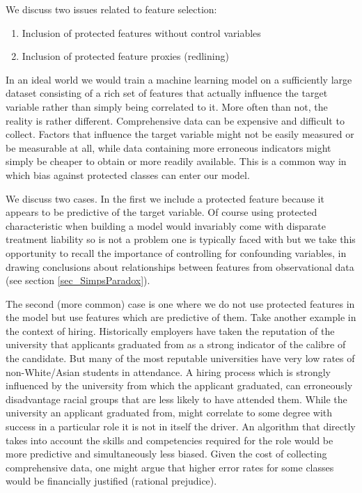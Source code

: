 We discuss two issues related to feature selection:
%
\begin{enumerate}
\item Inclusion of protected features without control variables
\item Inclusion of protected feature proxies (redlining)
\end{enumerate}

In an ideal world we would train a machine learning model on a sufficiently large dataset consisting of a rich set of features that actually influence the target variable rather than simply being correlated to it. More often than not, the reality is rather different. Comprehensive data can be expensive and difficult to collect. Factors that influence the target variable might not be easily measured or be measurable at all, while data containing more erroneous indicators might simply be cheaper to obtain or more readily available. This is a common way in which bias against protected classes can enter our model. 

We discuss two cases. In the first we include a protected feature because it appears to be predictive of the target variable. Of course using protected characteristic when building a model would invariably come with disparate treatment liability so is not a problem one is typically faced with but we take this opportunity to recall the importance of controlling for confounding variables, in drawing conclusions about relationships between features from observational data (see section \ref{sec_SimpsParadox}).

The second (more common) case is one where we do not use protected features in the model but use features which are predictive of them. Take another example in the context of hiring. Historically employers have taken the reputation of the university that applicants graduated from as a strong indicator of the calibre of the candidate. But many of the most reputable universities have very low rates of non-White/Asian students in attendance. A hiring process which is strongly influenced by the university from which the applicant graduated, can erroneously disadvantage racial groups that are less likely to have attended them. While the university an applicant graduated from, might correlate to some degree with success in a particular role it is not in itself the driver. An algorithm that directly takes into account the skills and competencies required for the role would be more predictive and simultaneously less biased. Given the cost of collecting comprehensive data, one might argue that higher error rates for some classes would be financially justified (rational prejudice).

